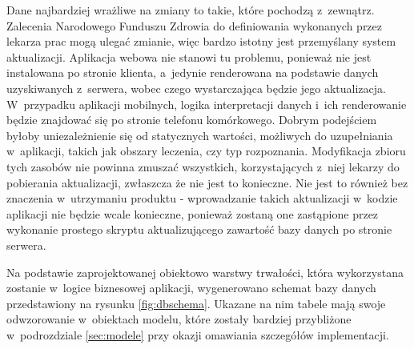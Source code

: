 \documentclass[11pt]{aghdpl}
\begin{document}
Dane najbardziej wrażliwe na zmiany to takie, które pochodzą z~zewnątrz. Zalecenia Narodowego Funduszu Zdrowia do definiowania wykonanych przez lekarza prac mogą ulegać zmianie, więc bardzo istotny jest przemyślany system aktualizacji. Aplikacja webowa nie stanowi tu problemu, ponieważ nie jest instalowana po stronie klienta, a~jedynie renderowana na podstawie danych uzyskiwanych z~serwera, wobec czego wystarczająca będzie jego aktualizacja. W~przypadku aplikacji mobilnych, logika interpretacji danych i~ich renderowanie będzie znajdować się po stronie telefonu komórkowego. Dobrym podejściem byłoby uniezależnienie się od statycznych wartości, możliwych do uzupełniania w~aplikacji, takich jak obszary leczenia, czy typ rozpoznania. Modyfikacja zbioru tych zasobów nie powinna zmuszać wszystkich, korzystających z~niej lekarzy do pobierania aktualizacji, zwłaszcza że nie jest to konieczne. Nie jest to również bez znaczenia w~utrzymaniu produktu - wprowadzanie takich aktualizacji w~kodzie aplikacji nie będzie wcale konieczne, ponieważ zostaną one zastąpione przez wykonanie prostego skryptu aktualizującego zawartość bazy danych po stronie serwera.

Na podstawie zaprojektowanej obiektowo warstwy trwałości, która wykorzystana zostanie w~logice biznesowej aplikacji, wygenerowano schemat bazy danych przedstawiony na rysunku \ref{fig:dbschema}. Ukazane na nim tabele mają swoje odwzorowanie w~obiektach modelu, które zostały bardziej przybliżone w~podrozdziale \ref{sec:modele} przy okazji omawiania szczegółów implementacji.
\end{document}
